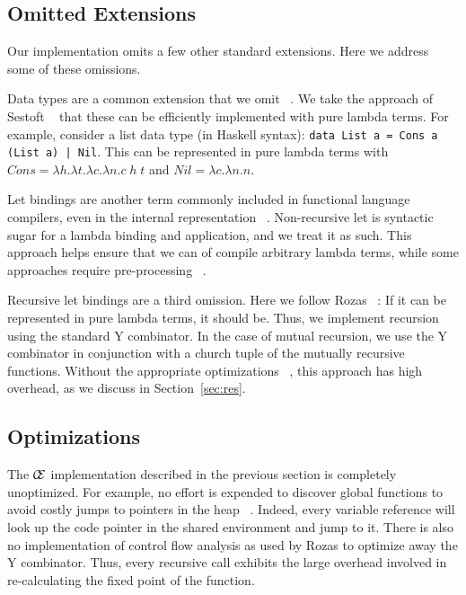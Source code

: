 \subsection{Omitted Extensions}

Our implementation omits a few other standard extensions. Here we address some
of these omissions.

Data types are a common extension that we omit ~\cite{jonesstg,boquist1997grin}.
We take the approach of Sestoft ~\cite{sestoft} that these can be efficiently
implemented with pure lambda terms. For example, consider a list data type (in
Haskell syntax): \texttt{data List a = Cons a (List a) | Nil}. This can be
represented in pure lambda terms with $\mathit{Cons} = \lambda h.\lambda t.\lambda
c.\lambda n.c \; h \; t$ and $\mathit{Nil} = \lambda c.\lambda n.n$. 

Let bindings are another term commonly included in functional language
compilers, even in the internal representation ~\cite{boquist1997grin,jonesstg}.
Non-recursive let is syntactic sugar for a lambda binding and application, and
we treat it as such. This approach helps ensure that we can of
compile arbitrary lambda terms, while some approaches require pre-processing
~\cite{sestoft,TIM}.

Recursive let bindings are a third omission. Here we follow Rozas
~\cite{rozas1992taming}: If it can be represented in pure lambda terms, it should
be. Thus, we implement recursion using the standard Y combinator. In the case of
mutual recursion, we use the Y combinator in conjunction with a church tuple of
the mutually recursive functions. Without the appropriate optimizations
~\cite{rozas1992taming}, this approach has high overhead, as we discuss in
Section~\ref{sec:res}.

\subsection{Optimizations}

The $\mathcal{C} \mskip -4mu \mathcal{E}$ implementation described in the previous section is 
completely unoptimized. For example, no effort is expended to
discover global functions to avoid costly jumps to pointers in the heap
~\cite{jonesstg}. Indeed, every variable reference will look up the code pointer
in the shared environment and jump to it. There is also no implementation of 
control flow analysis as used by Rozas to optimize away the Y combinator.  Thus,
every recursive call exhibits the large overhead involved in re-calculating the
fixed point of the function.  

